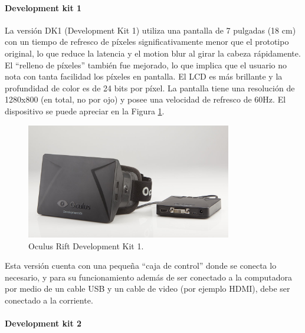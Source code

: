\documentclass[12pt]{article}
\begin{document}
\paragraph{Development kit 1}
La versión DK1 (Development Kit 1) utiliza una pantalla de 7 pulgadas (18 cm) con un tiempo de refresco de píxeles significativamente menor que el prototipo original, lo que reduce la latencia y el motion blur al girar la cabeza rápidamente. El “relleno de píxeles” también fue mejorado, lo que  implica que el usuario no nota con tanta facilidad los píxeles en pantalla. El LCD es más brillante y la profundidad de color es de 24 bits por píxel. La pantalla tiene una resolución de 1280x800 (en total, no por ojo) y posee una velocidad de refresco de 60Hz. El dispositivo se puede apreciar en la Figura \ref{dk1}.
\begin{figure}[h!]
\includegraphics[width=0.8\textwidth,center]{dk1.jpg}
\caption{Oculus Rift Development Kit 1.}
\label{dk1}
\end{figure}

Esta versión cuenta con una pequeña “caja de control” donde se conecta lo necesario, y para su funcionamiento además de ser conectado a la computadora por medio de un cable USB y un cable de video (por ejemplo HDMI), debe ser conectado a la corriente. 
\paragraph{Development kit 2}
\end{document}
